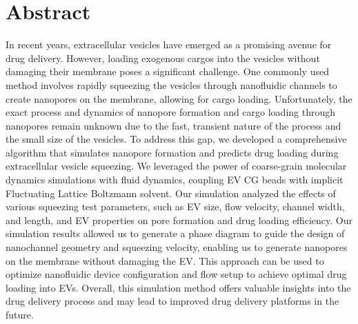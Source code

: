\chapter*{Abstract}
\hspace{1cm} In recent years, extracellular vesicles have emerged as a promising avenue for drug delivery. However, loading exogenous cargos into the vesicles without damaging their membrane poses a significant challenge. One commonly used method involves rapidly squeezing the vesicles through nanofluidic channels to create nanopores on the membrane, allowing for cargo loading. Unfortunately, the exact process and dynamics of nanopore formation and cargo loading through nanopores remain unknown due to the fast, transient nature of the process and the small size of the vesicles. To address this gap, we developed a comprehensive algorithm that simulates nanopore formation and predicts drug loading during extracellular vesicle squeezing. We leveraged the power of coarse-grain molecular dynamics simulations with fluid dynamics, coupling EV CG beads with implicit Fluctuating Lattice Boltzmann solvent. Our simulation analyzed the effects of various squeezing test parameters, such as EV size, flow velocity, channel width, and length, and EV properties on pore formation and drug loading efficiency. Our simulation results allowed us to generate a phase diagram to guide the design of nanochannel geometry and squeezing velocity, enabling us to generate nanopores on the membrane without damaging the EV. This approach can be used to optimize nanofluidic device configuration and flow setup to achieve optimal drug loading into EVs. Overall, this simulation method offers valuable insights into the drug delivery process and may lead to improved drug delivery platforms in the future.
